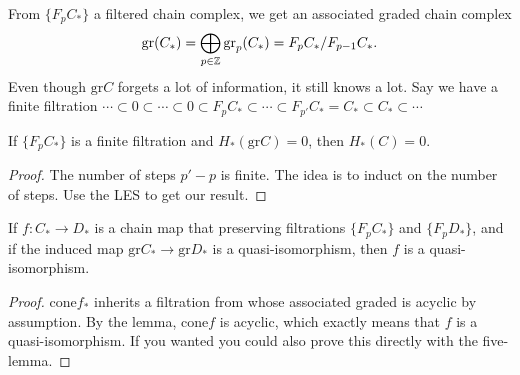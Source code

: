 From $\{F_pC_*\} $ a filtered chain complex, we get an associated graded chain complex \[
    \mathrm{gr}(C_*)=\bigoplus_{p \in \mathbb{Z}}\mathrm{gr}_p(C_*)=F_p C_* / F_{p-1}C_*.
\] Even though $\mathrm{gr}C$ forgets a lot of information, it still knows a lot. Say we have a finite filtration $\cdots \subset 0 \subset\cdots \subset 0 \subset F_p C_* \subset\cdots  \subset F_{p'} C_*=C_* \subset C_* \subset\cdots $
\begin{lemma}
    If $\{F_p C_*\} $ is a finite filtration and $H_*(\mathrm{gr}C)=0$, then $H_*(C)=0$.
\end{lemma}
\begin{proof}
    The number of steps $p'-p$ is finite. The idea is to induct on the number of steps. Use the LES to get our result.
\end{proof}
\begin{theorem}
    If $f \colon C_* \to D_*$ is a chain map that preserving filtrations $\{F_pC_*\} $ and $\{F_pD_*\} $, and if the induced map $\mathrm{gr}C_* \to \mathrm{gr}D_*$ is a quasi-isomorphism, then $f$ is a quasi-isomorphism.
\end{theorem}
\begin{proof}
    $\mathrm{cone}f_*$ inherits a filtration from whose associated graded is acyclic by assumption. By the lemma,  $\mathrm{cone}f$ is acyclic, which exactly means that $f$ is a quasi-isomorphism. If you wanted you could also prove this directly with the five-lemma.
\end{proof}
